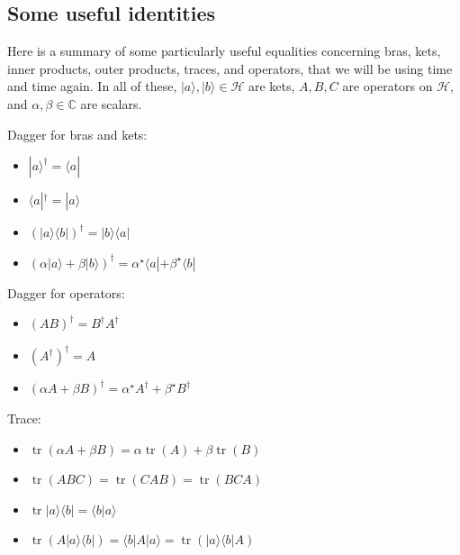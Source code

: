 \documentclass[fleqn,a4paper]{article}
\providecommand{\tightlist}{\setlength{\itemsep}{0pt}\setlength{\parskip}{0pt}}
\newenvironment{idea}{\everypar{\setlength{\parindent}{1.5em}}}{}
\theoremstyle{definition}
\theoremstyle{definition}
\theoremstyle{definition}
\theoremstyle{definition}
\theoremstyle{remark}
\begin{document}
\hypertarget{some-useful-identities}{%
\subsection{Some useful identities}\label{some-useful-identities}}

Here is a summary of some particularly useful equalities concerning bras, kets, inner products, outer products, traces, and operators, that we will be using time and time again.
In all of these, \(|a\rangle,|b\rangle\in\mathcal{H}\) are kets, \(A,B,C\) are operators on \(\mathcal{H}\), and \(\alpha,\beta\in\mathbb{C}\) are scalars.

\begin{idea}

Dagger for bras and kets:

\begin{itemize}
\tightlist
\item
  \(|a\rangle^\dagger = \langle a|\)
\item
  \(\langle a|^\dagger = |a\rangle\)
\item
  \((|a\rangle\langle b|)^\dagger = |b\rangle\langle a|\)
\item
  \((\alpha|a\rangle+\beta|b\rangle)^\dagger = \alpha^\star\langle a|+\beta^\star\langle b|\)
\end{itemize}

\end{idea}

\begin{idea}

Dagger for operators:

\begin{itemize}
\tightlist
\item
  \((AB)^\dagger = B^\dagger A^\dagger\)
\item
  \((A^\dagger)^\dagger = A\)
\item
  \((\alpha A+\beta B)^\dagger = \alpha^\star A^\dagger+\beta^\star B^\dagger\)
\end{itemize}

\end{idea}

\begin{idea}

Trace:

\begin{itemize}
\tightlist
\item
  \(\operatorname{tr}(\alpha A+\beta B) = \alpha \operatorname{tr}(A)+\beta\operatorname{tr}(B)\)
\item
  \(\operatorname{tr}(ABC) = \operatorname{tr}(CAB) = \operatorname{tr}(BCA)\)
\item
  \(\operatorname{tr}|a\rangle\langle b| = \langle b|a\rangle\)
\item
  \(\operatorname{tr}(A|a\rangle\langle b|) = \langle b|A|a\rangle = \operatorname{tr}(|a\rangle\langle b|A)\)
\end{itemize}

\end{idea}
\end{document}
